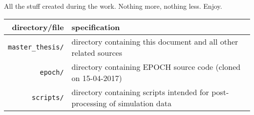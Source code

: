 All the stuff created during the work. Nothing more, nothing less. Enjoy.\\

\centering
{\renewcommand{\arraystretch}{1.5}
	\begin{tabular}{rl}
		\hline \textbf{directory/file} & \textbf{specification} \\
		\hline
		\hline
		\texttt{master\_thesis/} & \parbox[t]{8cm}{directory containing this document and all other related sources} \\
		\texttt{epoch/} & \parbox[t]{8cm}{directory containing EPOCH source code (cloned on 15-04-2017)} \\
		\texttt{scripts/} & \parbox[t]{8cm}{directory containing scripts intended for post-processing of simulation data} \\
		\hline
	\end{tabular}
}